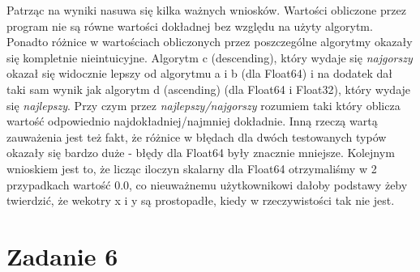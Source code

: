 \documentclass[]{article}
\begin{document}
	Patrząc na wyniki nasuwa się kilka ważnych wniosków. Wartości obliczone przez program nie są równe wartości dokładnej bez względu na użyty algorytm. Ponadto różnice w wartościach obliczonych przez poszczególne algorytmy okazały się kompletnie nieintuicyjne. Algorytm c (descending), który wydaje się \textit{najgorszy} okazał się widocznie lepszy od algorytmu a i b (dla Float64) i na dodatek dał taki sam wynik jak algorytm d (ascending) (dla Float64 i Float32), który wydaje się \textit{najlepszy}. Przy czym przez \textit{najlepszy/najgorszy} rozumiem taki który oblicza wartość odpowiednio najdokładniej/najmniej dokładnie. \newline
	Inną rzeczą wartą zauważenia jest też fakt, że różnice w błędach dla dwóch testowanych typów okazały się bardzo duże - błędy dla Float64 były znacznie mniejsze.
	Kolejnym wnioskiem jest to, że licząc iloczyn skalarny dla Float64 otrzymaliśmy w 2 przypadkach wartość 0.0, co nieuważnemu użytkownikowi dałoby podstawy żeby twierdzić, że wekotry x i y są prostopadłe, kiedy w rzeczywistości tak nie jest. 
	
	\clearpage
	\section*{Zadanie 6}
	
\end{document}
